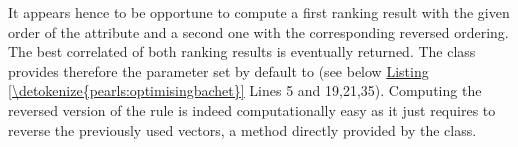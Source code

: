 \documentclass[a4paper,12pt,english]{sphinxhowto}
\begin{document}
\sphinxAtStartPar
It appears hence to be opportune to compute a first  ranking result with the given order of the  attribute and a second one with the corresponding reversed ordering. The best correlated of both ranking results is eventually returned. The  class provides therefore the  parameter set by default to  (see below \hyperref[\detokenize{pearls:optimisingbachet}]{Listing \ref{\detokenize{pearls:optimisingbachet}}} Lines 5 and 19,21,35). Computing the reversed version of the  rule is indeed computationally easy as it just requires to reverse the previously used  vectors, a method directly provided by the  class.
\def\sphinxLiteralBlockLabel{\label{\detokenize{pearls:optimisingbachet}}}
%
\end{document}
